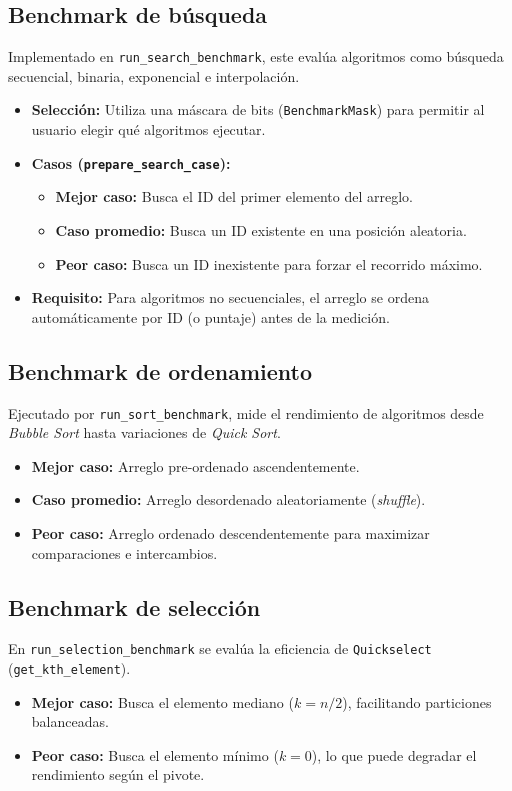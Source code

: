 \subsection{Benchmark de búsqueda}
Implementado en \texttt{run\_search\_benchmark}, este evalúa algoritmos como búsqueda secuencial, binaria, exponencial e interpolación.
\begin{itemize}
    \item \textbf{Selección:} Utiliza una máscara de bits (\texttt{BenchmarkMask}) para permitir al usuario elegir qué algoritmos ejecutar.
    \item \textbf{Casos (\texttt{prepare\_search\_case}):}
    \begin{itemize}
        \item \textbf{Mejor caso:} Busca el ID del primer elemento del arreglo.
        \item \textbf{Caso promedio:} Busca un ID existente en una posición aleatoria.
        \item \textbf{Peor caso:} Busca un ID inexistente para forzar el recorrido máximo.
    \end{itemize}
    \item \textbf{Requisito:} Para algoritmos no secuenciales, el arreglo se ordena automáticamente por ID (o puntaje) antes de la medición.
\end{itemize}

\subsection{Benchmark de ordenamiento}
Ejecutado por \texttt{run\_sort\_benchmark}, mide el rendimiento de algoritmos desde \textit{Bubble Sort} hasta variaciones de \textit{Quick Sort}.
\begin{itemize}
    \item \textbf{Mejor caso:} Arreglo pre-ordenado ascendentemente.
    \item \textbf{Caso promedio:} Arreglo desordenado aleatoriamente (\textit{shuffle}).
    \item \textbf{Peor caso:} Arreglo ordenado descendentemente para maximizar comparaciones e intercambios.
\end{itemize}

\subsection{Benchmark de selección}
En \texttt{run\_selection\_benchmark} se evalúa la eficiencia de \texttt{Quickselect} (\texttt{get\_kth\_element}).
\begin{itemize}
    \item \textbf{Mejor caso:} Busca el elemento mediano ($k = n/2$), facilitando particiones balanceadas.
    \item \textbf{Peor caso:} Busca el elemento mínimo ($k = 0$), lo que puede degradar el rendimiento según el pivote.
\end{itemize}


